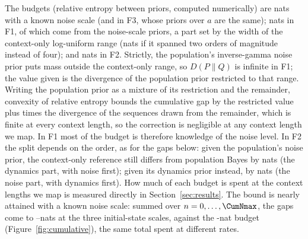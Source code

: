 The budgets (relative entropy between priors, computed numerically) are \KLoneA nats with a known noise scale (and in F3,
whose priors over $a$ are the same); \KLFone nats in F1, of which \KLFoneSigma come from the noise-scale priors, a part set by
the width of the context-only log-uniform range (\KLFoneSigmaNarrow nats if it spanned two orders of magnitude instead of
four); and \KLFtwo nats in
F2. Strictly, the population's inverse-gamma noise prior puts mass \FoneMassOutside outside the context-only range, so
$D(P\|Q)$ is infinite in F1; the value given is the divergence of the population prior restricted to that range. Writing the
population prior as a mixture of its restriction and the remainder, convexity of relative entropy bounds the cumulative gap by
the restricted value plus \FoneMassOutside times the divergence of the sequences drawn from the remainder, which is finite at
every context length, so the correction is negligible at any context length we map. In F1 most of the budget is therefore
knowledge of the noise level. In F2 the split depends on the order, as for the gaps below: given the population's noise
prior, the context-only reference still differs from population Bayes by \KLFtwoNM nats (the dynamics part, with noise
first); given its dynamics prior instead, by \KLFtwoDM nats (the noise part, with dynamics first). How much of each budget is
spent at the context lengths we map is measured directly in Section~\ref{sec:results}. The bound is nearly attained with a known noise scale: summed over $n=0,\dots,\CumNmax$, the gaps
come to \CumOneAMin--\CumOneAMax nats at the three initial-state scales, against the \KLoneA-nat budget
(Figure~\ref{fig:cumulative}), the same total spent at different rates.

